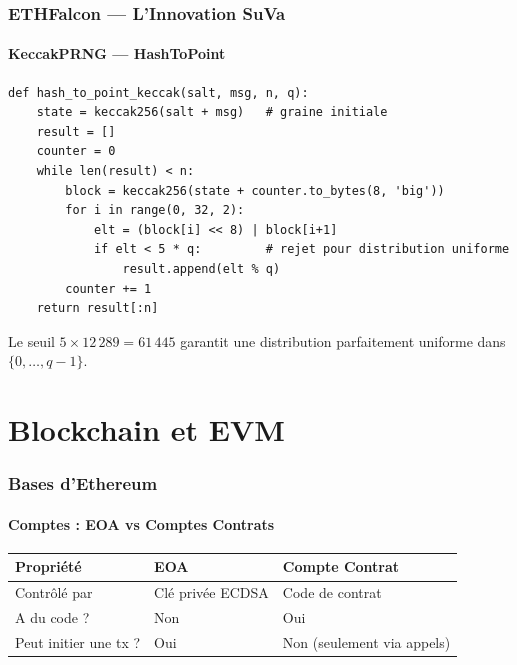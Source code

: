 \documentclass[11pt,a4paper]{article}
\begin{document}
\section{ETHFalcon --- L'Innovation SuVa}

\subsection{KeccakPRNG --- HashToPoint}

\begin{lstlisting}[style=python, caption={KeccakPRNG pour HashToPoint}]
def hash_to_point_keccak(salt, msg, n, q):
    state = keccak256(salt + msg)   # graine initiale
    result = []
    counter = 0
    while len(result) < n:
        block = keccak256(state + counter.to_bytes(8, 'big'))
        for i in range(0, 32, 2):
            elt = (block[i] << 8) | block[i+1]
            if elt < 5 * q:         # rejet pour distribution uniforme
                result.append(elt % q)
        counter += 1
    return result[:n]
\end{lstlisting}

Le seuil $5 \times 12\,289 = 61\,445$ garantit une distribution parfaitement uniforme dans $\{0,\ldots,q-1\}$.

\newpage
\part{Blockchain et EVM}

\section{Bases d'Ethereum}

\subsection{Comptes : EOA vs Comptes Contrats}

\begin{center}
\begin{tabular}{lll}
\toprule
\textbf{Propriété} & \textbf{EOA} & \textbf{Compte Contrat} \\
\midrule
Contrôlé par & Clé privée ECDSA & Code de contrat \\
A du code ?  & Non & Oui \\
Peut initier une tx ? & Oui & Non (seulement via appels) \\
\bottomrule
\end{tabular}
\end{center}
\end{document}
